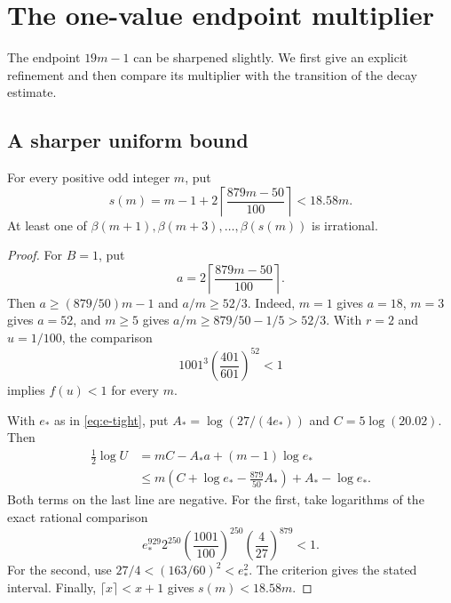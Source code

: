 \section{The one-value endpoint multiplier}\label{app:optimization}

The endpoint $19m-1$ can be sharpened slightly. We first give
an explicit refinement and then compare its multiplier with
the transition of the decay estimate.

\subsection{A sharper uniform bound}

\begin{proposition}\label{prop:one-sharp}
For every positive odd integer $m$, put
\begin{equation}\label{eq:one-endpoint}
 s(m)=m-1+2\left\lceil\frac{879m-50}{100}\right\rceil<18.58m.
\end{equation}
At least one of $\beta(m+1),\beta(m+3),\ldots,\beta(s(m))$
is irrational.
\end{proposition}

\begin{proof}
For $B=1$, put
\[
 a=2\left\lceil\frac{879m-50}{100}\right\rceil.
\]
Then $a\ge(879/50)m-1$ and $a/m\ge52/3$.
Indeed, $m=1$ gives $a=18$, $m=3$ gives $a=52$, and
$m\ge5$ gives $a/m\ge879/50-1/5>52/3$.
With $r=2$ and $u=1/100$, the comparison
\begin{equation}\label{eq:f-sharp}
 1001^3\left(\frac{401}{601}\right)^{52}<1
\end{equation}
implies $f(u)<1$ for every $m$.

With $e_*$ as in \eqref{eq:e-tight}, put
$A_*=\log(27/(4e_*))$ and $C=5\log(20.02)$.
Then
\begin{align*}
 \frac12\log U
 &=mC-A_*a+(m-1)\log e_*\\
 &\le m\left(C+\log e_*-\frac{879}{50}A_*\right)
                                      +A_*-\log e_*.
\end{align*}
Both terms on the last line are negative. For the first,
take logarithms of the exact rational comparison
\begin{equation}\label{eq:sharp-U}
 e_*^{929}2^{250}
       \left(\frac{1001}{100}\right)^{250}
       \left(\frac4{27}\right)^{879}<1.
\end{equation}
For the second, use $27/4<(163/60)^2<e_*^2$.
The criterion gives the stated interval. Finally,
$\lceil x\rceil<x+1$ gives $s(m)<18.58m$.
\end{proof}

